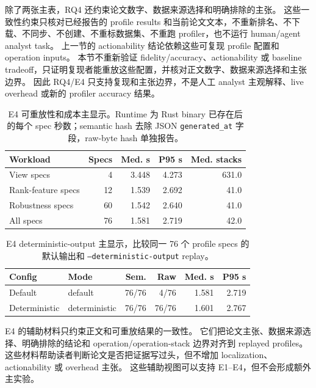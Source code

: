 \documentclass[10pt,twocolumn]{ctexart}
\begin{document}
除了两张主表，RQ4 还约束论文数字、数据来源选择和明确排除的主张。
这些一致性约束只核对已经报告的 profile results 和当前论文文本，不重新排名、不下载、不同步、不创建、不重标数据集、不重跑 profiler，也不运行 human/agent analyst task。
上一节的 actionability 结论依赖这些可复现 profile 配置和 operation inputs。
本节不重新验证 fidelity/accuracy、actionability 或 baseline tradeoff，只证明复现者能重放这些配置，并核对正文数字、数据来源选择和主张边界。
因此 RQ4/E4 只支持复现和主张边界，不是人工 analyst 主观解释、live overhead 或新的 profiler accuracy 结果。

\begin{table}[t]
  \centering
  \scriptsize
  \caption{E4 可重放性和成本主显示。Runtime 为 Rust binary 已存在后的每个 spec 秒数；semantic hash 去除 JSON \texttt{generated\_at} 字段，raw-byte hash 单独报告。}
  \label{tab:e4-replay-cost}
  \begin{tabular}{lrrrr}
    \toprule
    Workload & Specs & Med. s & P95 s & Med. stacks \\
    \midrule
    View specs & 4 & 3.448 & 4.273 & 631.0 \\
    Rank-feature specs & 12 & 1.539 & 2.692 & 41.0 \\
    Robustness specs & 60 & 1.542 & 2.640 & 41.0 \\
    All specs & 76 & 1.581 & 2.719 & 42.0 \\
    \bottomrule
  \end{tabular}
\end{table}

\begin{table}[t]
  \centering
  \scriptsize
  \caption{E4 deterministic-output 主显示，比较同一 76 个 profile specs 的默认输出和 \texttt{--deterministic-output} replay。}
  \label{tab:e4-determinism}
  \begin{tabular}{llrrrr}
    \toprule
    Config & Mode & Sem. & Raw & Med. s & P95 s \\
    \midrule
    Default & default & 76/76 & 4/76 & 1.581 & 2.719 \\
    Deterministic & deterministic & 76/76 & 76/76 & 1.601 & 2.767 \\
    \bottomrule
  \end{tabular}
\end{table}

E4 的辅助材料只约束正文和可重放结果的一致性。
它们把论文主张、数据来源选择、明确排除的结论和 operation/operation-stack 边界对齐到 replayed profiles。
这些材料帮助读者判断论文是否把证据写过头，但不增加 localization、actionability 或 overhead 主张。
这些辅助视图可以支持 E1--E4，但不会形成额外主实验。
\end{document}

